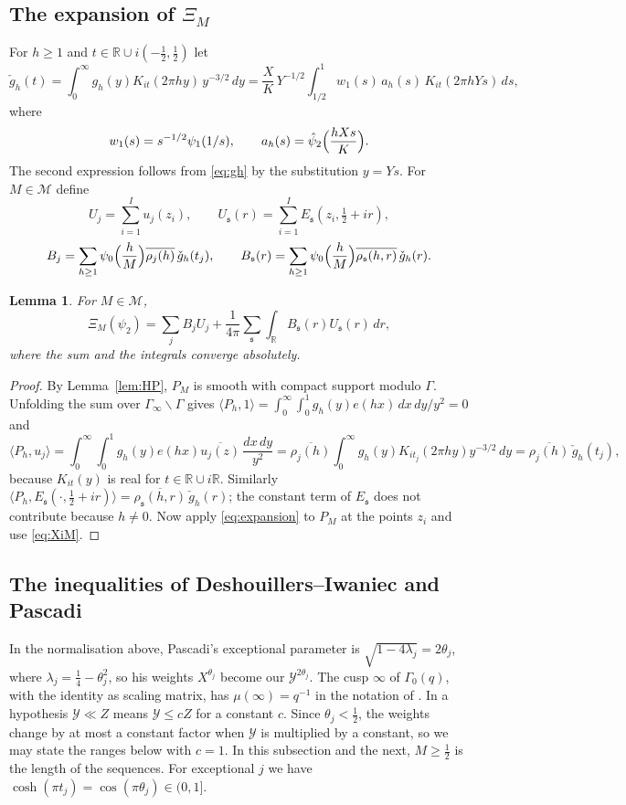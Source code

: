 \documentclass[11pt]{amsart}
\newtheorem{lemma}[theorem]{Lemma}
\theoremstyle{remark}
\theoremstyle{definition}
\numberwithin{equation}{section}
\newcommand{\Mset}{\mathcal{M}}
\newcommand{\R}{\mathbb{R}}
\newcommand{\gs}{\mathfrak{s}}
\newcommand{\br}[1]{\langle #1\rangle}
\begin{document}
\subsection{\texorpdfstring{The expansion of $\Xi_M$}{The expansion of Xi\_M}}
For $h\ge1$ and $t\in\R\cup i(-\frac12,\frac12)$ let
\begin{equation}\label{eq:Phi}
\check g_h(t)=\int_0^\infty g_h(y)K_{it}(2\pi hy)\,y^{-3/2}\,dy=\frac XK\,Y^{-1/2}\int_{1/2}^1w_1(s)\,a_h(s)\,K_{it}(2\pi hYs)\,ds,
\end{equation}
where
\[
w_1(s)=s^{-1/2}\psi_1(1/s),\qquad a_h(s)=\hat\psi_2\Bigl(\frac{hXs}K\Bigr).
\]
The second expression follows from \eqref{eq:gh} by the substitution $y=Ys$. For $M\in\Mset$ define
\[
U_j=\sum_{i=1}^Iu_j(z_i),\qquad U_\gs(r)=\sum_{i=1}^IE_\gs(z_i,\tfrac12+ir),
\]
\[
B_j=\sum_{h\ge1}\psi_0\Bigl(\frac hM\Bigr)\overline{\rho_j(h)}\,\check g_h(t_j),\qquad B_\gs(r)=\sum_{h\ge1}\psi_0\Bigl(\frac hM\Bigr)\overline{\rho_\gs(h,r)}\,\check g_h(r).
\]

\begin{lemma}\label{lem:expansion}
For $M\in\Mset$,
\[
\Xi_M(\psi_2)=\sum_jB_jU_j+\frac1{4\pi}\sum_\gs\int_\R B_\gs(r)U_\gs(r)\,dr,
\]
where the sum and the integrals converge absolutely.
\end{lemma}

\begin{proof}
By Lemma~\ref{lem:HP}, $P_M$ is smooth with compact support modulo $\Gamma$. Unfolding the sum over $\Gamma_\infty\backslash\Gamma$ gives $\br{P_h,1}=\int_0^\infty\int_0^1g_h(y)e(hx)\,dx\,dy/y^2=0$ and
\[
\br{P_h,u_j}=\int_0^\infty\int_0^1g_h(y)e(hx)\overline{u_j(z)}\,\frac{dx\,dy}{y^2}=\overline{\rho_j(h)}\int_0^\infty g_h(y)K_{it_j}(2\pi hy)y^{-3/2}\,dy=\overline{\rho_j(h)}\,\check g_h(t_j),
\]
because $K_{it}(y)$ is real for $t\in\R\cup i\R$. Similarly $\br{P_h,E_\gs(\cdot,\frac12+ir)}=\overline{\rho_\gs(h,r)}\,\check g_h(r)$; the constant term of $E_\gs$ does not contribute because $h\ne0$. Now apply \eqref{eq:expansion} to $P_M$ at the points $z_i$ and use \eqref{eq:XiM}.
\end{proof}

\subsection{The inequalities of Deshouillers--Iwaniec and Pascadi}
In the normalisation above, Pascadi's exceptional parameter is $\sqrt{1-4\lambda_j}=2\theta_j$, where $\lambda_j=\frac14-\theta_j^2$, so his weights $X^{\theta_j}$ become our $\mathcal Y^{2\theta_j}$. The cusp $\infty$ of $\Gamma_0(q)$, with the identity as scaling matrix, has $\mu(\infty)=q^{-1}$ in the notation of \cite{Pas}. In \cite{Pas} a hypothesis $\mathcal Y\ll Z$ means $\mathcal Y\le cZ$ for a constant $c$. Since $\theta_j<\frac12$, the weights change by at most a constant factor when $\mathcal Y$ is multiplied by a constant, so we may state the ranges below with $c=1$. In this subsection and the next, $M\ge\frac12$ is the length of the sequences. For exceptional $j$ we have $\cosh(\pi t_j)=\cos(\pi\theta_j)\in(0,1]$.
\end{document}
